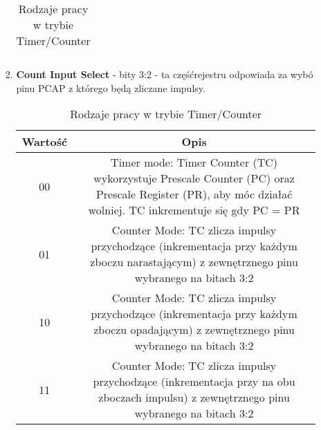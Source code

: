 \begin{enumerate}
\begin{enumerate}
\begin{enumerate}
\begin{table}[H]
\begin{tabular}{|c|c|}
                    \hline
                \end{tabular}
                \caption{Rodzaje pracy w trybie Timer/Counter}
            \end{table}
            \item \textbf{Count Input Select} - bity 3:2 - ta częśćrejestru odpowiada za wybó pinu PCAP z którego będą zliczane impulsy.\\
            \begin{table}[H]
                \centering
                \begin{tabular}{|c|c|}
                    \hline
                    Wartość & Opis\\
                    \hline
                    00  & Timer mode: Timer Counter (TC) wykorzystuje Prescale Counter (PC) oraz Prescale Register (PR), aby móc działać wolniej. TC inkrementuje się gdy PC = PR\\
                    01 & Counter Mode: TC zlicza impulsy przychodzące (inkrementacja przy każdym zboczu narastającym) z zewnętrznego pinu wybranego na bitach 3:2  \\
                    10 & Counter Mode: TC zlicza impulsy przychodzące (inkrementacja przy każdym zboczu opadającym) z zewnętrznego pinu wybranego na bitach 3:2  \\
                    11 & Counter Mode: TC zlicza impulsy przychodzące (inkrementacja przy na obu zboczach impulsu) z zewnętrznego pinu wybranego na bitach 3:2  \\
                    \hline
                \end{tabular}
                \caption{Rodzaje pracy w trybie Timer/Counter}
            \end{table}
            



        \end{enumerate}

    \end{enumerate}
\end{enumerate}
